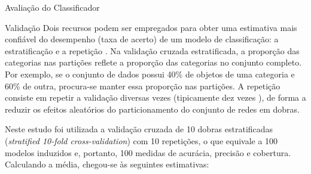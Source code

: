 \begin{section}{Avaliação do Classificador}
\begin{subsection}{Validação}
		Dois recursos podem ser empregados para obter uma estimativa mais confiável do desempenho (taxa de acerto) de um modelo de classificação: a estratificação e a repetição \cite{Witten2005}. Na validação cruzada estratificada, a proporção das categorias nas partições reflete a proporção das categorias no conjunto completo. Por exemplo, se o conjunto de dados possui 40\% de objetos de uma categoria e 60\% de outra, procura-se manter essa proporção nas partições. A repetição consiste em repetir a validação diversas vezes (tipicamente dez vezes \cite{Witten2005}), de forma a reduzir os efeitos aleatórios do particionamento do conjunto de redes em dobras.

		Neste estudo foi utilizada a validação cruzada de 10 dobras estratificadas (\emph{stratified 10-fold cross-validation}) com 10 repetições, o que equivale a 100 modelos induzidos e, portanto, 100 medidas de acurácia, precisão e cobertura. Calculando a média, chegou-se às seguintes estimativas:




% 



\end{subsection}
\end{section}
